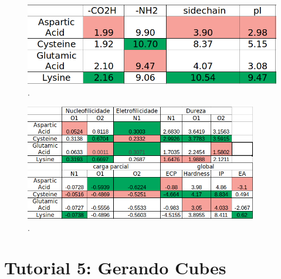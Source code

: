 \documentclass[a4paper,11pt]{refart}
\begin{document}
\hspace*{-\leftmarginwidth}
\begin{minipage}{\fullwidth}
	\begin{figure}[H]
		\begin{center}
			\includegraphics[width=5in]{images/tut4_img17}
			\caption{.}
			\label{fig_tut4_15}
		\end{center}
	\end{figure}
\end{minipage}

\hspace*{-\leftmarginwidth}
\begin{minipage}{\fullwidth}
	\begin{figure}[H]
		\begin{center}
			\includegraphics[width=4in]{images/tut4_img18}
			\caption{.}
			\label{fig_tut4_16}
		\end{center}
	\end{figure}
\end{minipage}


\section{Tutorial 5: Gerando Cubes}
\end{document}
